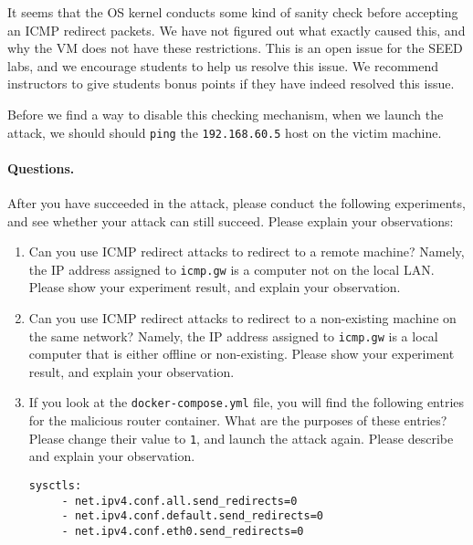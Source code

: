 It seems that the OS kernel conducts some kind of 
sanity check before accepting an ICMP redirect packets. 
We have not figured out what exactly caused this, 
and why the VM does not have these restrictions. 
This is an open issue for the SEED labs, and we encourage 
students to help us resolve this issue. We recommend instructors
to give students bonus points if they have indeed resolved this issue. 


Before we find a way to disable this checking mechanism, 
when we launch the attack,
we should should \texttt{ping} the \texttt{192.168.60.5} host on the 
victim machine. 


\paragraph{Questions.} After you have succeeded in the attack, please 
conduct the following experiments, and see whether your attack can 
still succeed. Please explain your observations:

\begin{enumerate}
\item Can you use ICMP redirect attacks to redirect to a remote machine? Namely,
the IP address assigned to \texttt{icmp.gw} is a computer not on the local LAN. 
Please show your experiment result, and explain your observation.  

\item Can you use ICMP redirect attacks to redirect to a non-existing machine on
the same network? Namely, the IP address assigned to \texttt{icmp.gw} is a local computer that
is either offline or non-existing. 
Please show your experiment result, and explain your observation.  

\item If you look at the \texttt{docker-compose.yml} file, you will find the 
following entries for the malicious router container. What are the purposes
of these entries? Please change their value to \texttt{1}, and launch the attack again. 
Please describe and explain your observation. 

\begin{lstlisting}
sysctls:
     - net.ipv4.conf.all.send_redirects=0
     - net.ipv4.conf.default.send_redirects=0
     - net.ipv4.conf.eth0.send_redirects=0
\end{lstlisting}
 
\end{enumerate}





